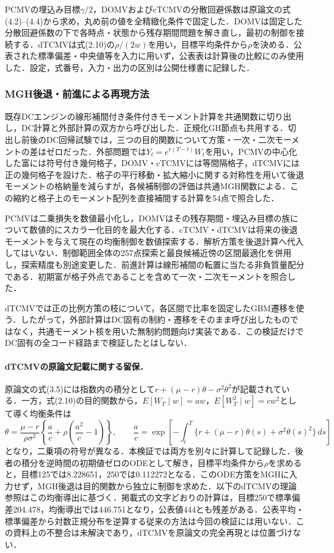 \documentclass[10pt,a4paper]{article}
\theoremstyle{plain}
\theoremstyle{definition}
\begin{document}
PCMVの埋込み目標$\gamma/2$，DOMVおよびcTCMVの分散回避係数は原論文の式(4.2)--(4.4)から求め，丸め前の値を全精緻化条件で固定した．DOMVは固定した分散回避係数の下で各時点・状態から残存期間問題を解き直し，最初の制御を接続する．dTCMVは式(2.10)の$\rho/(2w)$を用い，目標平均条件から$\rho$を決める．公表された標準偏差・中央値等を入力に用いず，公表表は計算後の比較にのみ使用した．設定，式番号，入力・出力の区別は公開仕様書に記録した．

\subsubsection{MGH後退・前進による再現方法}

既存DCエンジンの線形補間付き条件付きモーメント計算を共通関数に切り出し，DC計算と外部計算の双方から呼び出した．正規化GH節点も共用する．切出し前後のDC回帰試験では，三つの目的関数について方策・一次・二次モーメントの差はゼロだった．外部問題では$Y_t=e^{r(T-t)}W_t$を用い，PCMVの中心化した富には符号付き幾何格子，DOMV・cTCMVには等間隔格子，dTCMVには正の幾何格子を設けた．格子の平行移動・拡大縮小に関する対称性を用いて後退モーメントの格納量を減らすが，各候補制御の評価は共通MGH関数による．この縮約と格子上のモーメント配列を直接補間する計算を54点で照合した．

PCMVは二乗損失を数値最小化し，DOMVはその残存期間・埋込み目標の族について数値的にスカラー化目的を最大化する．cTCMV・dTCMVは将来の後退モーメントを与えて現在の均衡制御を数値探索する．解析方策を後退計算へ代入してはいない．制御範囲全体の257点探索と最良候補近傍の区間最適化を併用し，探索精度も別途変更した．前進計算は線形補間の転置に当たる非負質量配分である．初期富が格子外点であることを含めて一次・二次モーメントを照合した．

dTCMVでは正の比例方策の枝について，各区間で比率を固定したGBM遷移を使う．したがって，外部計算はDC固有の制約・遷移をそのまま呼び出したものではなく，共通モーメント核を用いた無制約問題向け実装である．この検証だけでDC固有の全コード経路まで検証したとはしない．

\paragraph{dTCMVの原論文記載に関する留保．}
原論文の式(3.5)には指数内の積分として$r+(\mu-r)\theta-\sigma^2\theta^2$が記載されている．一方，式(2.10)の目的関数から，$E[W_T\mid w]=aw$，$E[W_T^2\mid w]=cw^2$として導く均衡条件は
\[
 \theta=\frac{\mu-r}{\rho\sigma^2}
 \left\{\frac{a}{c}+\rho\left(\frac{a^2}{c}-1\right)\right\},
 \qquad
 \frac{a}{c}=\exp\!\left[-\int_t^T
 \{r+(\mu-r)\theta(s)+\sigma^2\theta(s)^2\}\,ds\right]
\]
となり，二乗項の符号が異なる．本検証では両方を別々に計算して記録した．後者の積分を逆時間の初期値ゼロのODEとして解き，目標平均条件から$\rho$を求めると，目標125では8.228651，250では0.112272となる．このODE方策をMGHに入力せず，MGH後退は目的関数から独立に制御を求めた．以下のdTCMVの理論参照はこの均衡導出に基づく．掲載式の文字どおりの計算は，目標250で標準偏差204.478，均衡導出では446.751となり，公表値444とも残差がある．公表平均・標準偏差から対数正規分布を逆算する従来の方法は今回の検証には用いない．この資料上の不整合は未解決であり，dTCMVを原論文の完全再現とは位置づけない．
\end{document}
